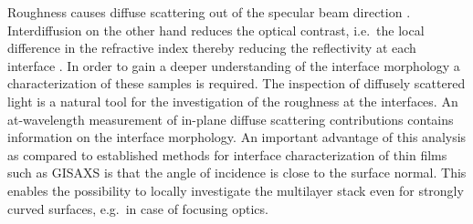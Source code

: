 Roughness causes diffuse scattering out of the specular beam direction \cite{sinha_scattering_natural_tool}. Interdiffusion on the other hand reduces the optical contrast, i.e.~the local difference in the refractive index thereby reducing the reflectivity at each interface \cite{nakajima_interdiffusion}. In order to gain a deeper understanding of the interface morphology a characterization of these samples is required. The inspection of diffusely scattered light is a natural tool for the investigation of the roughness at the interfaces. An at-wavelength measurement of in-plane diffuse scattering contributions contains information on the interface morphology. An important advantage of this analysis as compared to established methods for interface characterization of thin films such as GISAXS \cite{Levine:pn0068} is that the angle of incidence is close to the surface normal. This enables the possibility to locally investigate the multilayer stack even for strongly curved surfaces, e.g.~in case of focusing 
optics.



